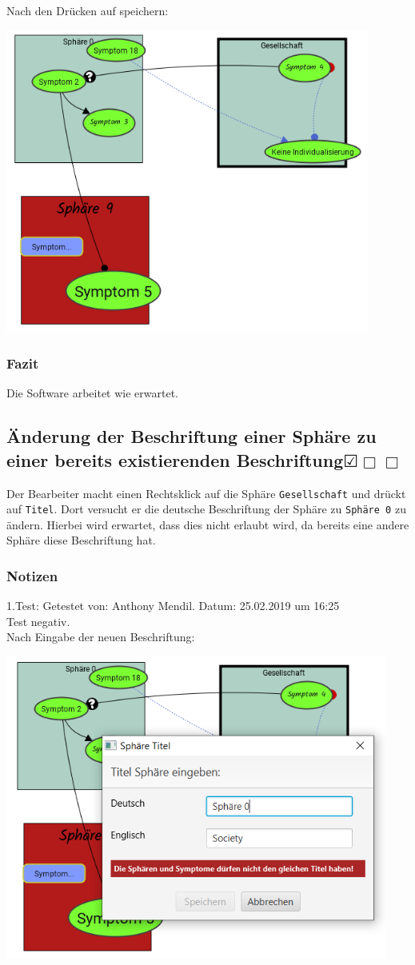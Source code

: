 \documentclass{scrartcl}
\newcommand{\subsectiont}[2]{\subsection[#1]{#1{\normalsize\normalfont #2}}}
\newcommand{\leer}{$\Box$}
\newcommand{\ok}{$\CheckedBox$}
\begin{document}
Nach den Drücken auf speichern:
\begin{center}
\includegraphics[height=10cm]{3_49speichern.PNG}
\end{center}
\subsubsection{Fazit}
Die Software arbeitet wie erwartet.

\subsectiont{Änderung der Beschriftung einer Sphäre zu einer bereits existierenden Beschriftung}{\dotfill\ok\leer\leer}
Der Bearbeiter macht einen Rechtsklick auf die Sphäre \texttt{Gesellschaft} und drückt auf \texttt{Titel}. Dort versucht er die deutsche Beschriftung der Sphäre zu \texttt{Sphäre 0} zu ändern. Hierbei wird erwartet, dass dies nicht erlaubt wird, da bereits eine andere Sphäre diese Beschriftung hat. 
\subsubsection{Notizen}
1.Test: Getestet von: Anthony Mendil. Datum: 25.02.2019 um 16:25 \\
Test negativ. \\
Nach Eingabe der neuen Beschriftung: 
\begin{center}
\includegraphics[height=10cm]{3_50.PNG}
\end{center}
\end{document}
